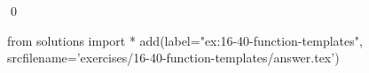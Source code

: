 
\begin{ex}
  \label{ex:16-40-function-templates}
  
  \qed
\end{ex}
\begin{python0}
from solutions import *
add(label="ex:16-40-function-templates",
    srcfilename='exercises/16-40-function-templates/answer.tex')
\end{python0}
